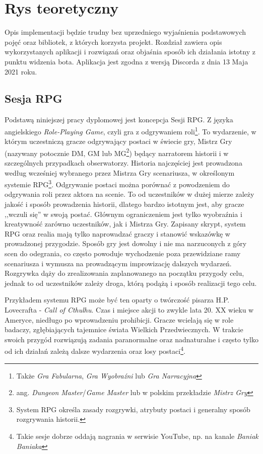 \documentclass[shortabstract,inz]{iithesis}
\begin{document}
		
		
	\chapter{Rys teoretyczny}
	Opis implementacji będzie trudny bez uprzedniego wyjaśnienia podstawowych pojęć oraz bibliotek, z których korzysta projekt. Rozdział zawiera opis wykorzystanych aplikacji i rozwiązań oraz objaśnia sposób ich działania istotny z punktu widzenia bota. Aplikacja jest zgodna z wersją Discorda z dnia 13 Maja 2021 roku.
		\section{Sesja RPG}
			Podstawą niniejszej pracy dyplomowej jest koncepcja Sesji RPG. Z języka angielskiego \textit{Role-Playing Game}, czyli gra z odgrywaniem roli\footnote{Także \textit{Gra Fabularna}, \textit{Gra Wyobraźni} lub \textit{Gra Narracyjna}}. To wydarzenie, w którym uczestniczą gracze odgrywający postaci w świecie gry, Mistrz Gry (nazywany potocznie DM, GM lub MG\footnote{ang. \textit{Dungeon Master}/\textit{Game Master} lub w polskim przekładzie \textit{Mistrz Gry}}) będący narratorem historii i w szczególnych przypadkach obserwatorzy. Historia najczęściej jest prowadzona według wcześniej wybranego przez Mistrza Gry scenariusza, w określonym systemie RPG\footnote{System RPG określa zasady rozgrywki, atrybuty postaci i generalny sposób rozgrywania historii.}. Odgrywanie postaci można porównać z powodzeniem do odgrywania roli przez aktora na scenie. To od uczestników w dużej mierze zależy jakość i sposób prowadzenia historii, dlatego bardzo istotnym jest, aby gracze ,,wczuli się'' w swoją postać. Głównym ograniczeniem jest tylko wyobraźnia i kreatywność zarówno uczestników, jak i Mistrza Gry. Zapisany skrypt, system RPG oraz realia mają tylko naprowadzać graczy i stanowić wskazówkę w prowadzonej przygodzie. Sposób gry jest dowolny i nie ma narzuconych z góry scen do odegrania, co często powoduje wychodzenie poza przewidziane ramy scenariusza i wymusza na prowadzącym improwizację dalszych wydarzeń. Rozgrywka dąży do zrealizowania zaplanowanego na początku przygody celu, jednak to od uczestników zależy droga, którą podążą i sposób realizacji tego celu. 
			
			Przykładem systemu RPG może być ten oparty o twórczość pisarza H.P. Lovecrafta\cite{lovecraft} - \textit{Call of Cthulhu}\cite{callofcthulhu}. Czas i miejsce akcji to zwykle lata 20. XX wieku w Ameryce, niedługo po wprowadzeniu prohibicji. Gracze wcielają się w role badaczy, zgłębiających tajemnice świata Wielkich Przedwiecznych. W trakcie swoich przygód rozwiązują zadania paranormalne oraz nadnaturalne i często tylko od ich działań zależą dalsze wydarzenia oraz losy postaci\footnote{Takie sesje dobrze oddają nagrania w serwisie YouTube, np. na kanale \textit{Baniak Baniaka}\cite{baniakbaniaka}}.
			
\end{document}

